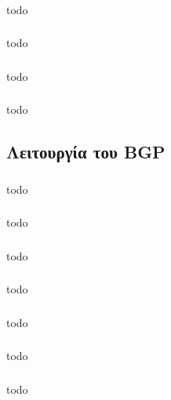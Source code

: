 \documentclass[a4paper, 12pt]{article}
\begin{document}
		\subsubsection{}
			todo

		\subsubsection{}
			todo

		\subsubsection{}
			todo

		\subsubsection{}
			todo

	\subsection{Λειτουργία του BGP}

		\subsubsection{}
			todo

		\subsubsection{}
			todo

		\subsubsection{}
			todo

		\subsubsection{}
			todo

		\subsubsection{}
			todo

		\subsubsection{}
			todo

		\subsubsection{}
			todo
\end{document}
